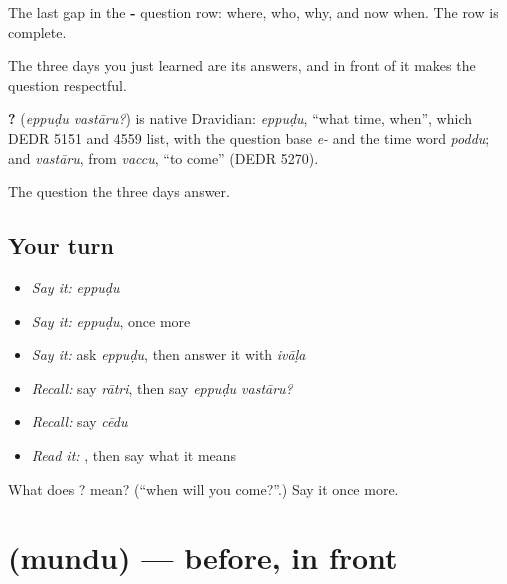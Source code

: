 The last gap in the \textbf{-} question row:  where,  who,  why, and now  when. The row is complete.

The three days you just learned are its answers, and \textbf{} in front of it makes the question respectful.

\begin{cousinweb}
\textbf{ ?} (\emph{eppuḍu vastāru?}) is native Dravidian: \emph{eppuḍu}, \textquotedblleft{}what time, when\textquotedblright{}, which DEDR 5151 and 4559 list, with the question base \emph{e-} and the time word \emph{poddu}; and \emph{vastāru}, from \emph{vaccu}, \textquotedblleft{}to come\textquotedblright{} (DEDR 5270).
\end{cousinweb}

\begin{grammarlens}[title={What you've built}]
The question the three days answer.
\end{grammarlens}

\subsection*{Your turn}
\begin{itemize}
\raggedright
  \item \emph{Say it:} \emph{eppuḍu}
  \item \emph{Say it:} \emph{eppuḍu}, once more
  \item \emph{Say it:} ask \emph{eppuḍu}, then answer it with \emph{ivāḷa}
  \item \emph{Recall:} say \emph{rātri}, then say \emph{eppuḍu vastāru?}
  \item \emph{Recall:} say \emph{cēdu}
  \item \emph{Read it:} \textbf{}, then say what it means
\end{itemize}

\begin{tcolorbox}[breakable,colback=teal!4,colframe=teal!35!black,title={Before you move on}]
What does  ? mean? (\textquotedblleft{}when will you come?\textquotedblright{}.) Say it once more.
\end{tcolorbox}
\section[\texorpdfstring{\te{ముందు} (mundu)}{ముందు (mundu)}]{ (mundu) — before, in front}

